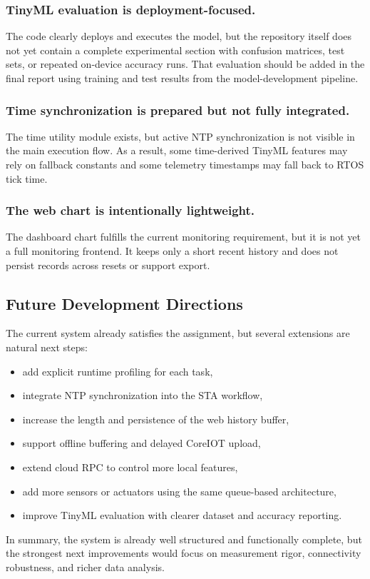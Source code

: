 \subsubsection*{TinyML evaluation is deployment-focused.}
The code clearly deploys and executes the model, but the repository itself does
not yet contain a complete experimental section with confusion matrices, test
sets, or repeated on-device accuracy runs. That evaluation should be added in
the final report using training and test results from the model-development
pipeline.

\subsubsection*{Time synchronization is prepared but not fully integrated.}
The time utility module exists, but active NTP synchronization is not visible in
the main execution flow. As a result, some time-derived TinyML features may rely
on fallback constants and some telemetry timestamps may fall back to RTOS tick
time.

\subsubsection*{The web chart is intentionally lightweight.}
The dashboard chart fulfills the current monitoring requirement, but it is not
yet a full monitoring frontend. It keeps only a short recent history and does
not persist records across resets or support export.

\subsection{Future Development Directions}
The current system already satisfies the assignment, but several extensions are
natural next steps:
\begin{itemize}
  \item add explicit runtime profiling for each task,
  \item integrate NTP synchronization into the STA workflow,
  \item increase the length and persistence of the web history buffer,
  \item support offline buffering and delayed CoreIOT upload,
  \item extend cloud RPC to control more local features,
  \item add more sensors or actuators using the same queue-based architecture,
  \item improve TinyML evaluation with clearer dataset and accuracy reporting.
\end{itemize}

In summary, the system is already well structured and functionally complete, but
the strongest next improvements would focus on measurement rigor, connectivity
robustness, and richer data analysis.
